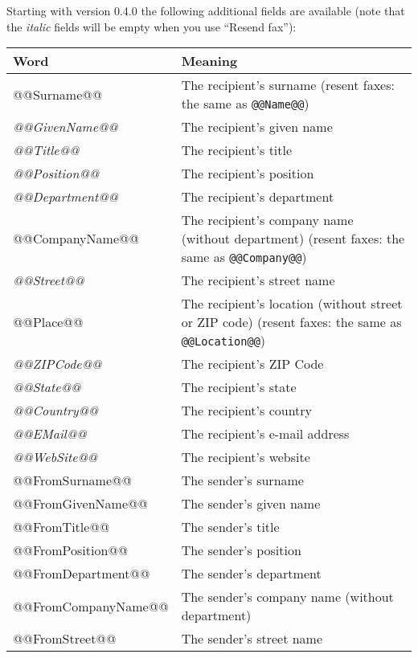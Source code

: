 \documentclass[a4paper,10pt]{scrartcl}
\begin{document}
Starting with version 0.4.0 the following additional fields are available (note that the \textit{italic} fields will be empty when you use ``Resend fax''):
\begin{center}
\begin{tabular}{|l|p{}|}
\hline
\bfseries Word & \bfseries Meaning \\
\hline\hline
\ttfamily @@Surname@@ & The recipient's surname (resent faxes: the same as \texttt{@@Name@@}) \\\hline
\ttfamily\itshape @@GivenName@@ & The recipient's given name \\\hline
\ttfamily\itshape @@Title@@ & The recipient's title \\\hline
\ttfamily\itshape @@Position@@ & The recipient's position \\\hline
\ttfamily\itshape @@Department@@ & The recipient's department\\\hline
\ttfamily @@CompanyName@@ & The recipient's company name (without department) (resent faxes: the same as \texttt{@@Company@@})\\\hline
\ttfamily\itshape @@Street@@ & The recipient's street name \\\hline
\ttfamily @@Place@@ & The recipient's location (without street or ZIP code) (resent faxes: the same as \texttt{@@Location@@})\\\hline
\ttfamily\itshape @@ZIPCode@@ & The recipient's ZIP Code \\\hline
\ttfamily\itshape @@State@@ & The recipient's state\\\hline
\ttfamily\itshape @@Country@@ & The recipient's country\\\hline
\ttfamily\itshape @@EMail@@ & The recipient's e-mail address\\\hline
\ttfamily\itshape @@WebSite@@ & The recipient's website\\\hline\hline
\ttfamily @@FromSurname@@ & The sender's  surname \\\hline
\ttfamily @@FromGivenName@@ & The sender's  given name \\\hline
\ttfamily @@FromTitle@@ & The sender's  title \\\hline
\ttfamily @@FromPosition@@ & The sender's position \\\hline
\ttfamily @@FromDepartment@@ & The sender's  department\\\hline
\ttfamily @@FromCompanyName@@ & The sender's  company name (without department)\\\hline
\ttfamily @@FromStreet@@ & The sender's  street name \\\hline

\end{tabular}
\end{center}
\end{document}
